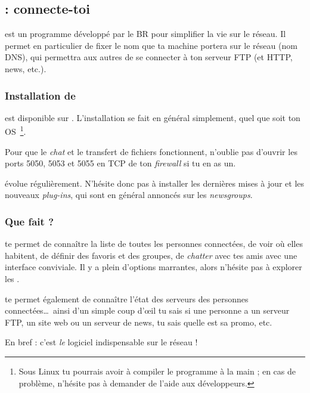 
\subsection{ : connecte-toi}
\label{qrezix}

 est un programme développé par le BR pour simplifier la vie sur le réseau.
Il permet en particulier de fixer le nom que ta machine portera sur le réseau (nom DNS),
qui permettra aux autres de se connecter à ton serveur FTP (et HTTP, news, etc.).


\subsubsection{Installation de }

 est disponible sur \xshare. L'installation se fait en général simplement, quel que soit ton
OS~\footnote{Sous Linux tu pourrais avoir à compiler le programme à la main ;
en cas de problème, n'hésite pas à demander de l'aide aux développeurs.}.

Pour que le \emph{chat} et le transfert de fichiers fonctionnent, n'oublie pas d'ouvrir les ports 5050, 5053 et 5055 en TCP de ton \emph{firewall} si
tu en as un.

 évolue régulièrement. N'hésite donc pas à installer les dernières mises à jour et les nouveaux \emph{plug-ins}, qui sont en général
annoncés sur les \emph{newsgroups}.

\subsubsection{Que fait  ?}

 te permet de connaître la liste de toutes les personnes connectées, de voir où elles habitent, de définir des favoris et des groupes, de
\emph{chatter} avec tes amis avec une interface conviviale. Il y a plein d'options marrantes, alors n'hésite pas à explorer les .

 te permet également de connaître l'état des serveurs des personnes connectées\ldots\
ainsi d'un simple coup d'\oe il tu sais si une personne a un serveur FTP,
un site web ou un serveur de news, tu sais quelle est sa promo, etc.

En bref :  c'est \emph{le} logiciel indispensable sur le réseau !

